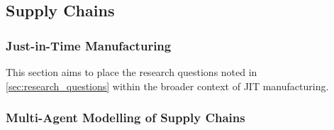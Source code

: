 \subsection{Supply Chains}

\subsubsection{Just-in-Time Manufacturing}

This section aims to place the research questions noted in \cref{sec:research_questions} within the broader context of JIT manufacturing.

\subsubsection{Multi-Agent Modelling of Supply Chains}
